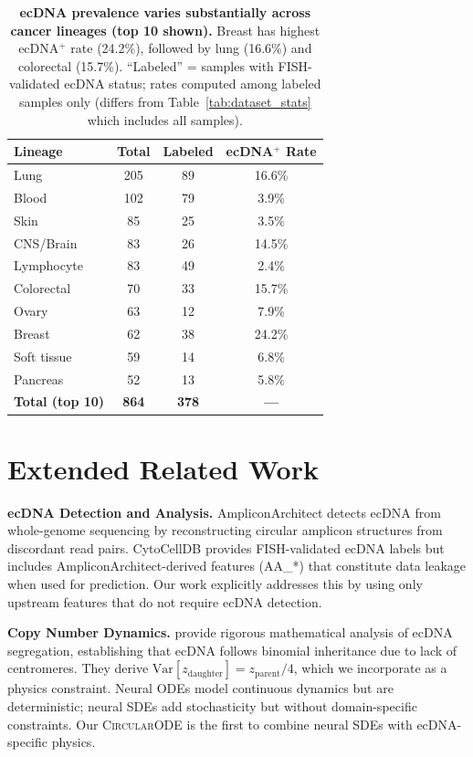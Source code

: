 \documentclass{article}
\newcommand{\circularode}{\textsc{CircularODE}}
\begin{document}
\begin{table}[ht]
\caption{\textbf{ecDNA prevalence varies substantially across cancer lineages (top 10 shown).} Breast has highest ecDNA$^+$ rate (24.2\%), followed by lung (16.6\%) and colorectal (15.7\%). ``Labeled'' = samples with FISH-validated ecDNA status; rates computed among labeled samples only (differs from Table~\ref{tab:dataset_stats} which includes all samples).}
\label{tab:lineage_prevalence}
\centering
\small
\begin{tabular}{@{}lccc@{}}
\toprule
Lineage & Total & Labeled & ecDNA$^+$ Rate \\
\midrule
Lung & 205 & 89 & 16.6\% \\
Blood & 102 & 79 & 3.9\% \\
Skin & 85 & 25 & 3.5\% \\
CNS/Brain & 83 & 26 & 14.5\% \\
Lymphocyte & 83 & 49 & 2.4\% \\
Colorectal & 70 & 33 & 15.7\% \\
Ovary & 63 & 12 & 7.9\% \\
Breast & 62 & 38 & 24.2\% \\
Soft tissue & 59 & 14 & 6.8\% \\
Pancreas & 52 & 13 & 5.8\% \\
\midrule
\textbf{Total (top 10)} & \textbf{864} & \textbf{378} & \textbf{---} \\
\bottomrule
\end{tabular}
\end{table}

\section{Extended Related Work}
\label{app:related}

\textbf{ecDNA Detection and Analysis.} AmpliconArchitect \citep{deshpande_2019_amplicon} detects ecDNA from whole-genome sequencing by reconstructing circular amplicon structures from discordant read pairs. CytoCellDB \citep{cytocelldb_2024} provides FISH-validated ecDNA labels but includes AmpliconArchitect-derived features (AA\_*) that constitute data leakage when used for prediction. Our work explicitly addresses this by using only upstream features that do not require ecDNA detection.

\textbf{Copy Number Dynamics.} \citet{lange_2022_mathematical} provide rigorous mathematical analysis of ecDNA segregation, establishing that ecDNA follows binomial inheritance due to lack of centromeres. They derive $\text{Var}[z_{\text{daughter}}] = z_{\text{parent}}/4$, which we incorporate as a physics constraint. Neural ODEs \citep{chen_2018_neuralode} model continuous dynamics but are deterministic; neural SDEs \citep{li_2020_neuralsde} add stochasticity but without domain-specific constraints. Our \circularode{} is the first to combine neural SDEs with ecDNA-specific physics.
\end{document}
